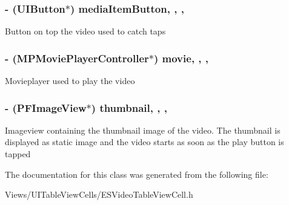 \subsubsection[{media\+Item\+Button}]{\setlength{\rightskip}{0pt plus 5cm}-\/ (U\+I\+Button$\ast$) media\+Item\+Button\hspace{0.3cm}{\ttfamily [read]}, {\ttfamily [write]}, {\ttfamily [nonatomic]}, {\ttfamily [strong]}}\label{interface_e_s_video_table_view_cell_a9d576f3f1ad5d975e2b82fc09f75fd12}
Button on top the video used to catch taps \hypertarget{interface_e_s_video_table_view_cell_a24eb7e1fb1973ff5fed8dd0b7e6bc5a1}{}
\subsubsection[{movie}]{\setlength{\rightskip}{0pt plus 5cm}-\/ (M\+P\+Movie\+Player\+Controller$\ast$) movie\hspace{0.3cm}{\ttfamily [read]}, {\ttfamily [write]}, {\ttfamily [nonatomic]}, {\ttfamily [retain]}}\label{interface_e_s_video_table_view_cell_a24eb7e1fb1973ff5fed8dd0b7e6bc5a1}
Movieplayer used to play the video \hypertarget{interface_e_s_video_table_view_cell_ada77b7a35791b50d7e01070a0d86042a}{}
\subsubsection[{thumbnail}]{\setlength{\rightskip}{0pt plus 5cm}-\/ (P\+F\+Image\+View$\ast$) thumbnail\hspace{0.3cm}{\ttfamily [read]}, {\ttfamily [write]}, {\ttfamily [nonatomic]}, {\ttfamily [strong]}}\label{interface_e_s_video_table_view_cell_ada77b7a35791b50d7e01070a0d86042a}
Imageview containing the thumbnail image of the video. The thumbnail is displayed as static image and the video starts as soon as the play button is tapped 

The documentation for this class was generated from the following file\+:\begin{DoxyCompactItemize}
\item 
Views/\+U\+I\+Table\+View\+Cells/E\+S\+Video\+Table\+View\+Cell.\+h\end{DoxyCompactItemize}
